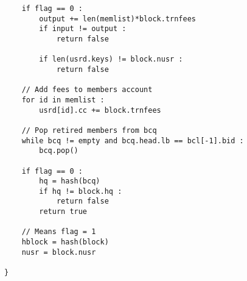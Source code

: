 \begin{enumerate}
\begin{lstlisting}
    if flag == 0 :
        output += len(memlist)*block.trnfees
        if input != output :
            return false
        
        if len(usrd.keys) != block.nusr :
            return false

    // Add fees to members account
    for id in memlist :
        usrd[id].cc += block.trnfees
    
    // Pop retired members from bcq
    while bcq != empty and bcq.head.lb == bcl[-1].bid :
        bcq.pop()
    
    if flag == 0 :
        hq = hash(bcq)
        if hq != block.hq :
            return false
        return true
    
    // Means flag = 1
    hblock = hash(block)
    nusr = block.nusr
    
}
    \end{lstlisting}
\end{enumerate}

